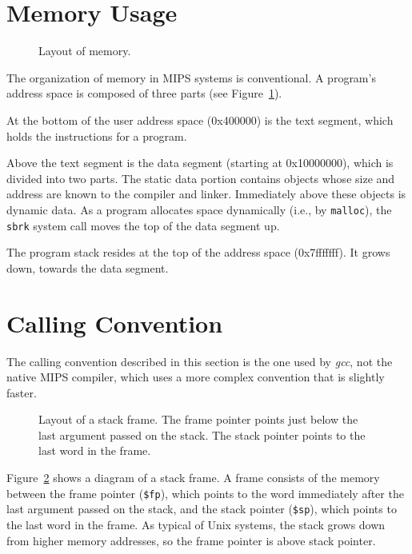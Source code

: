 \documentclass[11pt]{article}
\begin{document}
\section{Memory Usage}

\begin{figure}
  \centerline{}
  \caption{Layout of memory.}
  \label{fig:mem}
\end{figure}
The organization of memory in MIPS systems is conventional.  A
program's address space is composed of three parts (see
Figure~\ref{fig:mem}).

At the bottom of the user address space (0x400000) is the text
segment, which holds the instructions for a program.

Above the text segment is the data segment (starting at 0x10000000),
which is divided into two parts.  The static data portion contains
objects whose size and address are known to the compiler and linker.
Immediately above these objects is dynamic data.  As a program
allocates space dynamically (i.e., by {\tt malloc}), the {\tt sbrk}
system call moves the top of the data segment up.

The program stack resides at the top of the address space
(0x7f{f}f{f}f{f}f).  It grows down, towards the data segment.

\section{Calling Convention}

The calling convention described in this section is the one used by
{\em gcc\/}, not the native MIPS compiler, which uses a more complex
convention that is slightly faster.

\begin{figure}
  \centerline{}
  \caption{Layout of a stack frame.  The frame pointer points just
below the last argument passed on the stack.  The stack pointer points
to the last word in the frame.}
  \label{fig:stack}
\end{figure}
Figure~\ref{fig:stack} shows a diagram of a stack frame.  A frame
consists of the memory between the frame pointer ({\tt \$fp}), which
points to the word immediately after the last argument passed on the
stack, and the stack pointer ({\tt \$sp}), which points to the last
word in the frame.  As typical of Unix systems, the stack grows
down from higher memory addresses, so the frame pointer is above stack
pointer.
\end{document}
